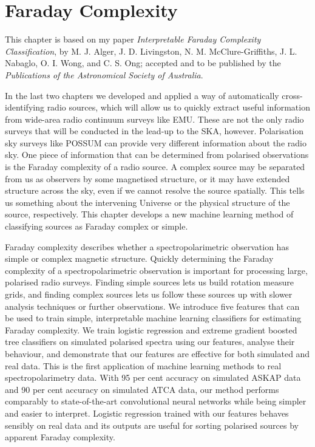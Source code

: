 \chapter{Faraday Complexity}
\label{cha:faraday}

This chapter is based on my paper \emph{Interpretable Faraday Complexity Classification}, by M. J. Alger, J. D. Livingston, N. M. McClure-Griffiths, J. L. Nabaglo, O. I. Wong, and C. S. Ong; accepted and to be published by the \emph{Publications of the Astronomical Society of Australia}.

In the last two chapters we developed and applied a way of automatically cross-identifying radio sources, which will allow us to quickly extract useful information from wide-area radio continuum surveys like EMU. These are not the only radio surveys that will be conducted in the lead-up to the SKA, however. Polarisation sky surveys like POSSUM can provide very different information about the radio sky. One piece of information that can be determined from polarised observations is the Faraday complexity of a radio source. A complex source may be separated from us as observers by some magnetised structure, or it may have extended structure across the sky, even if we cannot resolve the source spatially. This tells us something about the intervening Universe or the physical structure of the source, respectively. This chapter develops a new machine learning method of classifying sources as Faraday complex or simple.

Faraday complexity describes whether a spectropolarimetric observation has simple or complex magnetic structure. Quickly determining the Faraday complexity of a spectropolarimetric observation is important for processing large, polarised radio surveys. Finding simple sources lets us build rotation measure grids, and finding complex sources lets us follow these sources up with slower analysis techniques or further observations. We introduce five features that can be used to train simple, interpretable machine learning classifiers for estimating Faraday complexity. We train logistic regression and extreme gradient boosted tree classifiers on simulated polarised spectra using our features, analyse their behaviour, and demonstrate that our features are effective for both simulated and real data. This is the first application of machine learning methods to real spectropolarimetry data. With 95 per cent accuracy on simulated ASKAP data and 90 per cent accuracy on simulated ATCA data, our method performs comparably to state-of-the-art convolutional neural networks while being simpler and easier to interpret. Logistic regression trained with our features behaves sensibly on real data and its outputs are useful for sorting polarised sources by apparent Faraday complexity.

